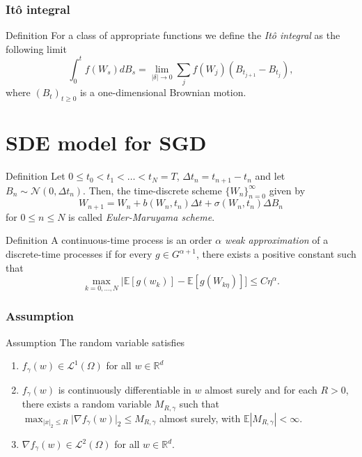 \documentclass[17pt,institute=e10]{tuhh_presentation}
\newcommand{\norm}[1]{\lvert {#1} \rvert_2}
\newcommand{\E}[1]{\mathbb{E}\left[{#1} \right]}
\begin{document}
\begin{frame}
  \frametitle{Itô integral}
  \begin{block}{Definition}
    For a class of appropriate functions we define the \emph{\textcolor{purple-pontifex}{Itô integral}} as the following limit
\begin{equation*}
  \int_0^t f(W_s) dB_s = \lim\limits_{|\delta| \rightarrow 0} \sum_j f(W_j)(B_{t_{j+1}} - B_{t_j}),
\end{equation*}
where $(B_t)_{t \geq 0}$ is a one-dimensional Brownian motion.
  \end{block}
  
\end{frame}
\section{SDE model for SGD}
\begin{frame}
  \begin{block}{Definition}
    Let $0 \leq t_0 < t_1 < \dots < t_N = T$, $\Delta t_n = t_{n+1} - t_n$ and let $B_n \sim \mathcal{N}(0,\Delta t_n)$. Then, the time-discrete scheme $\{W_n\}_{n=0}^\infty$ given by
\begin{equation*}
  W_{n+1} = W_n + b(W_n, t_n)\Delta t + \sigma(W_n, t_n) \Delta B_n
\end{equation*}
for $0 \leq n \leq N$ is called \emph{\textcolor{purple-pontifex}{Euler-Maruyama scheme}}.
  \end{block}
\end{frame}
\begin{frame}
\begin{block}{Definition}
  A continuous-time process is an order $\alpha$ \emph{\textcolor{purple-pontifex}{weak approximation}} of a discrete-time processes if for every $g \in G^{\alpha + 1}$, there exists a positive constant such that
  \begin{equation*}
    \max_{k=0,\dots,N} |\E{g(w_k)} - \E{g(W_{k\eta})}] \leq C \eta^\alpha.
  \end{equation*}
\end{block}
\end{frame}
\begin{frame}
  \frametitle{Assumption}
\begin{block}{Assumption}
  The random variable satisfies 
  \begin{enumerate}
    \item $f_{\gamma}(w) \in \mathcal{L}^1(\Omega)$ for all $w \in \mathbb{R}^d$
    \item $f_{\gamma}(w)$ is continuously differentiable in $w$ almost surely and for each $R > 0$, there exists a random variable $M_{R,\gamma}$ such that $\max_{\norm{x} \leq R} \norm{ \nabla f_{\gamma}(w) } \leq M_{R,\gamma}$ almost surely, with $\mathbb{E} |M_{R,\gamma}| < \infty$.
    \item $\nabla f_{\gamma}(w) \in \mathcal{L}^2(\Omega)$ for all $w \in \mathbb{R}^d$.
  \end{enumerate}
\end{block}
\end{frame}
\end{document}
